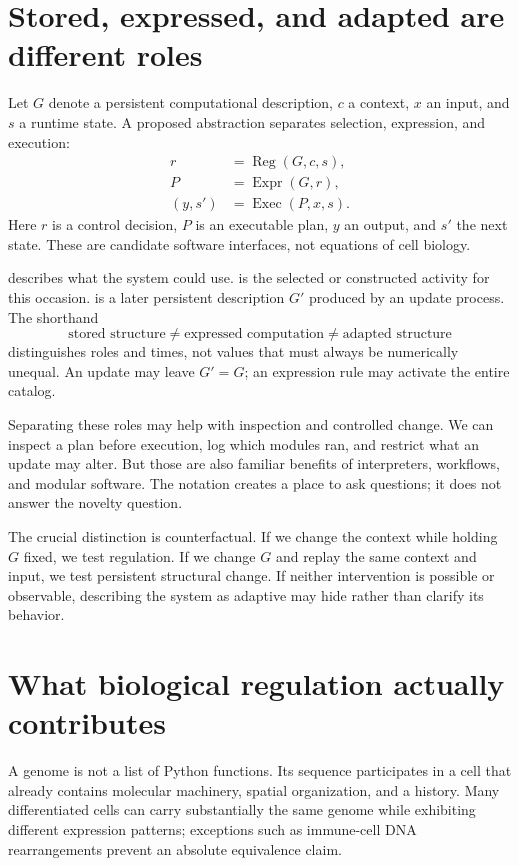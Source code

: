 \section{Stored, expressed, and adapted are different roles}\label{sec:stored}
Let $G$ denote a persistent computational description, $c$ a context, $x$ an input, and $s$ a runtime state. A proposed abstraction separates selection, expression, and execution:
\[
 \begin{aligned}
 r&=\operatorname{Reg}(G,c,s),\\
 P&=\operatorname{Expr}(G,r),\\
 (y,s')&=\operatorname{Exec}(P,x,s).
 \end{aligned}
\]
Here $r$ is a control decision, $P$ is an executable plan, $y$ an output, and $s'$ the next state. These are candidate software interfaces, not equations of cell biology.

 describes what the system could use.  is the selected or constructed activity for this occasion.  is a later persistent description $G'$ produced by an update process. The shorthand
\[
 \text{stored structure}\ne\text{expressed computation}
 \ne\text{adapted structure}
\]
distinguishes roles and times, not values that must always be numerically unequal. An update may leave $G'=G$; an expression rule may activate the entire catalog.

Separating these roles may help with inspection and controlled change. We can inspect a plan before execution, log which modules ran, and restrict what an update may alter. But those are also familiar benefits of interpreters, workflows, and modular software. The notation creates a place to ask questions; it does not answer the novelty question.

The crucial distinction is counterfactual. If we change the context while holding $G$ fixed, we test regulation. If we change $G$ and replay the same context and input, we test persistent structural change. If neither intervention is possible or observable, describing the system as adaptive may hide rather than clarify its behavior.

\section{What biological regulation actually contributes}\label{sec:biology}
A genome is not a list of Python functions. Its sequence participates in a cell that already contains molecular machinery, spatial organization, and a history. Many differentiated cells can carry substantially the same genome while exhibiting different expression patterns; exceptions such as immune-cell DNA rearrangements prevent an absolute equivalence claim.\cite{control,development}

